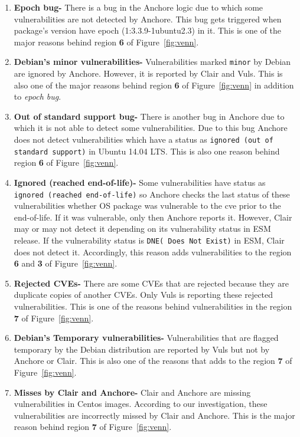 \begin{enumerate}
\item\textbf{Epoch bug-} There is a bug in the Anchore logic due to which some vulnerabilities are
                not detected by Anchore. This bug gets triggered when package’s version have epoch
		(1:3.3.9-1ubuntu2.3) in it. This is one of the major reasons behind region \textbf{6}
		of Figure~\ref{fig:venn}.

\item\textbf{Debian's minor vulnerabilities-} Vulnerabilities marked \texttt{minor}
		 by Debian are ignored by Anchore. However, it is reported by Clair
		  and Vuls. This is also one of the major reasons behind region \textbf{6}
		  of Figure~\ref{fig:venn} in addition to \textit{epoch bug}.

\item\textbf{Out of standard support bug-} There is another bug in Anchore due to
                which it is not able to detect some vulnerabilities. Due to this bug Anchore does not detect
		vulnerabilities which have a status as \texttt{ignored (out of standard support)} in Ubuntu 14.04 LTS.
                This is also one reason behind region \textbf{6} of Figure~\ref{fig:venn}.

\item\textbf{Ignored (reached end-of-life)-} Some vulnerabilities have status as \texttt{ignored (reached end-of-life)}
                so Anchore checks the last status of these vulnerabilities whether OS package was vulnerable to the cve
                prior to the end-of-life. If it was vulnerable, only then Anchore reports it.
                However, Clair may or may not detect it depending on its vulnerability status in ESM release.
		If the vulnerability status is \texttt{DNE( Does Not Exist)} in ESM, Clair does not
		detect it.
		Accordingly, this reason adds vulnerabilities to the region \textbf{6} and \textbf{3} of Figure~\ref{fig:venn}.

\item\textbf{Rejected CVEs-} There are some CVEs that are rejected because they are duplicate copies of another CVEs.
            Only Vuls is reporting these rejected vulnerabilities. This is one of the reasons behind
		vulnerabilities in the region \textbf{7} of Figure~\ref{fig:venn}.

\item\textbf{Debian's Temporary vulnerabilities-} Vulnerabilities that are flagged temporary by the
            Debian distribution are reported by Vuls but not by Anchore or
		Clair. This is also one of the reasons that adds to the region \textbf{7} of Figure~\ref{fig:venn}. 

\item\textbf{Misses by Clair and Anchore-} Clair and Anchore are missing vulnerabilities in Centos images.
	According to our investigation, these vulnerabilities are incorrectly missed by Clair and Anchore. This is the major reason behind
		region \textbf{7} of Figure~\ref{fig:venn}.
\end{enumerate}
